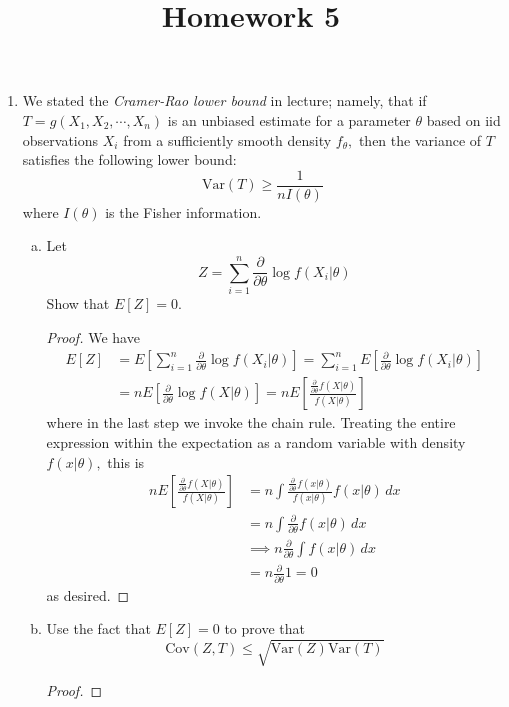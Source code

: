 \documentclass{article}
\newcommand{\var}{\mathrm{Var}}
\newcommand{\cov}{\mathrm{Cov}}
\begin{document}
\title{Homework 5}
\maketitle
\thispagestyle{fancy}

\begin{enumerate}
	\item We stated the \textit{Cramer-Rao lower bound} in lecture; namely, that if $T=g(X_1, X_2, \cdots, X_n)$ is an unbiased estimate for a parameter $\theta$ based on iid observations $X_i$ from a sufficiently smooth density $f_\theta,$ then the variance of $T$ satisfies the following lower bound: \[\var(T)\ge\frac{1}{nI(\theta)}\] where $I(\theta)$ is the Fisher information. 

		\begin{enumerate}[(a)]
			\item Let \[Z=\sum_{i=1}^{n}\frac{\partial}{\partial\theta}\log f(X_i|\theta)\] Show that $E[Z]=0.$
				\begin{proof}
					We have 
					\begin{align*}
						E[Z] &= E\left[ \sum_{i=1}^{n} \frac{\partial}{\partial\theta}\log f(X_i|\theta) \right] = \sum_{i=1}^{n} E\left[ \frac{\partial}{\partial\theta}\log f(X_i|\theta) \right] \\
						&=nE\left[ \frac{\partial}{\partial\theta}\log f(X|\theta) \right] = nE\left[ \frac{\frac{\partial}{\partial\theta}f(X|\theta)}{f(X|\theta)} \right]
					\end{align*} where in the last step we invoke the chain rule. Treating the entire expression within the expectation as a random variable with density $f(x|\theta),$ this is
					\begin{align*}
						nE\left[  \frac{\frac{\partial}{\partial\theta}f(X|\theta)}{f(X|\theta)}\right] &= n\int \frac{\frac{\partial}{\partial\theta}f(x|\theta)}{f(x|\theta)}f(x|\theta)\, dx \\
						&= n\int \frac{\partial}{\partial\theta} f(x|\theta)\, dx \\
						&\implies n\frac{\partial}{\partial\theta}\int f(x|\theta)\, dx \\
						&= n\frac{\partial}{\partial\theta}1 = 0
					\end{align*} as desired.
					
				\end{proof}

			\item Use the fact that $E[Z]=0$ to prove that \[\cov(Z, T)\le\sqrt{\var(Z)\var(T)}\]
				\begin{proof}
					

\end{proof}
\end{enumerate}
\end{enumerate}
\end{document}
